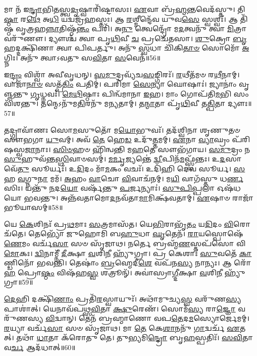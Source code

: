 𑌮𑌾 𑌨᳴ 𑌇\-\ul{𑌨𑍍𑌦𑍍𑌰𑌾}\-𑌭𑌿\-\ul{𑌤}\-𑌸𑍍𑌤𑍍𑌵\-\ul{𑌦𑍃}\-𑌷𑍍𑌵𑌾𑌰𑌿᳴𑌷𑍍𑌟𑌾𑌸𑌃।
\-\ul{𑌏}\-𑌵𑌾 𑌬𑍍𑌰᳴\-\ul{𑌹𑍍𑌮}\-𑌨𑍍𑌤𑌵𑍇𑌦᳴𑌸𑍍𑌤𑍁।
𑌤𑌿\-\ul{𑌷𑍍𑌠𑌾} 𑌰\-\ul{𑌥𑍇} 𑌅\-\ul{𑌧𑌿} 𑌯𑌦𑍍𑌵𑌜𑍍𑌰᳴𑌹𑌸𑍍𑌤𑌃।
𑌆 \ul{𑌰}\-𑌶𑍍𑌮𑍀𑌨𑍍𑌦𑍇᳴𑌵 𑌯𑍁𑌵\-\ul{𑌸𑍇} 𑌸𑍍𑌵𑌶𑍍𑌵𑌃᳴।
𑌆 𑌤𑌿᳴𑌷𑍍𑌠 𑌵𑍃𑌤𑍍𑌰𑌹\-\ul{𑌨𑍍𑌨𑌾}\-𑌤𑌿𑌷𑍍𑌠᳴\-\ul{𑌨𑍍𑌤𑌂} 𑌪𑌰𑌿᳴।
𑌅\-\ul{𑌨𑍁} 𑌤𑍍𑌵𑍇𑌨𑍍𑌦𑍍𑌰𑍋᳴ 𑌮\-\ul{𑌦}\-𑌤𑍍𑌵𑌨𑍁᳴ 𑌤𑍍𑌵𑌾 \ul{𑌮𑌿}\-𑌤𑍍𑌰𑌾𑌵𑌰𑍁᳴𑌣𑍗।
𑌦𑍍𑌯𑍗𑌶𑍍𑌚᳴ 𑌤𑍍𑌵𑌾 𑌪𑍃\-\ul{𑌥𑌿}\-𑌵𑍀 \ul{𑌚} 𑌪𑍍𑌰𑌚𑍇᳴𑌤𑌸𑌾।
\-\ul{𑌶𑍁}\-𑌕𑍍𑌰𑍋 \ul{𑌬𑍃}\-𑌹𑌦𑍍𑌦𑌕𑍍𑌷𑌿᳴𑌣𑌾 𑌤𑍍𑌵𑌾 𑌪𑌿𑌪𑌰𑍍𑌤𑍁।
𑌅𑌨𑍁᳴ \ul{𑌸𑍍𑌵}\-𑌧𑌾 𑌚𑌿᳴𑌕𑌿\-\ul{𑌤𑌾}\-\-\ul{𑍞} 𑌸𑍋𑌮𑍋᳴ \ul{𑌅}\-𑌗𑍍𑌨𑌿𑌃।
𑌅𑌨𑍁᳴ 𑌤𑍍𑌵𑌾𑌽𑌵𑌤𑍁 𑌸\-\ul{𑌵𑌿}\-𑌤𑌾 \ul{𑌸}\-𑌵𑍇𑌨᳴॥56॥

𑌇\-\ul{𑌨𑍍𑌦𑍍𑌰𑌂} 𑌵𑌿𑌶𑍍𑌵𑌾᳴ 𑌅𑌵𑍀𑌵𑍃𑌧𑌨𑍍।
\-\ul{𑌸}\-\-\ul{𑌮𑍁}\-𑌦𑍍𑌰𑌵𑍍𑌯᳴𑌚\-\ul{𑌸}\-𑌙𑍍𑌗𑌿𑌰𑌃᳴।
\-\ul{𑌰}\-𑌥𑍀𑌤᳴𑌮𑍞 𑌰\-\ul{𑌥𑍀}\-𑌨𑌾𑌮𑍍।
𑌵𑌾𑌜𑌾᳴\-\ul{𑌨𑌾}\-\-\ul{𑍞} 𑌸𑌤𑍍𑌪᳴\-\ul{𑌤𑌿𑌂} 𑌪𑌤𑌿𑌮𑍍॑।
𑌪𑌰𑌿᳴𑌮𑌾 \ul{𑌸𑍇}\-𑌨𑍍𑌯𑌾 𑌘𑍋𑌷𑌾𑌃॑।
𑌜𑍍𑌯𑌾𑌨𑌾𑌂॑ 𑌵𑍃𑌞𑍍𑌜𑌨𑍍𑌤𑍁 \ul{𑌗𑍃}\-𑌧𑍍𑌨𑌵𑌃᳴।
\-\ul{𑌮𑍇}\-\-\ul{𑌥𑌿}\-𑌷𑍍𑌠𑌾𑌃 𑌪𑌿𑌨𑍍𑌵᳴𑌮𑌾𑌨𑌾 \ul{𑌇}\-𑌹।
𑌮𑌾𑌂 𑌗𑍋𑌪᳴𑌤𑌿\-\ul{𑌮}\-𑌭𑌿 𑌸𑌂𑌵𑌿᳴𑌶𑌨𑍍𑌤𑍁।
𑌤𑌨𑍍𑌮𑍇\-𑌽𑌨𑍁᳴𑌮\-\ul{𑌤𑌿}\-𑌰𑌨𑍁᳴ 𑌮𑌨𑍍𑌯𑌤𑌾𑌮𑍍।
𑌤\-\ul{𑌨𑍍𑌮𑌾}\-𑌤𑌾 𑌪𑍃᳴\-\ul{𑌥𑌿}\-𑌵𑍀 𑌤\-\ul{𑌤𑍍𑌪𑌿}\-𑌤𑌾 𑌦𑍍𑌯𑍗𑌃॥57॥

𑌤𑌦𑍍𑌗𑍍𑌰𑌾𑌵𑌾᳴𑌣𑌃 𑌸𑍋\-\ul{𑌮}\-𑌸𑍁𑌤𑍋᳴ 𑌮\-\ul{𑌯𑍋}\-𑌭𑍁𑌵𑌃᳴।
𑌤𑌦᳴𑌶𑍍𑌵𑌿𑌨𑌾 𑌶𑍃𑌣𑍁𑌤𑍞 𑌸𑍗𑌭𑌗𑌾 \ul{𑌯𑍁}\-𑌵𑌮𑍍।
𑌅𑌵᳴ \ul{𑌤𑍇} 𑌹𑍇\-\ul{𑌡} 𑌉𑌦𑍁᳴\-\ul{𑌤𑍍𑌤}\-𑌮𑌮𑍍।
\-\ul{𑌏}\-𑌨𑌾 \ul{𑌵𑍍𑌯𑌾}\-𑌘𑍍𑌰𑌂 𑌪᳴𑌰𑌿𑌷𑌸𑍍𑌵\-\ul{𑌜𑌾}\-𑌨𑌾𑌃।
\-\ul{𑌸𑌿}\-\-\ul{𑍞}\-𑌹𑍞 𑌹𑌿᳴𑌨𑍍𑌵𑌨𑍍𑌤𑌿 𑌮\-\ul{𑌹}\-𑌤𑍇 𑌸𑍗𑌭᳴𑌗𑌾𑌯।
\-\ul{𑌸}\-\-\ul{𑌮𑍁}\-𑌦𑍍𑌰𑌂 𑌨 \ul{𑌸𑍁}\-𑌹𑍁𑌵᳴𑌨𑍍𑌤\-\ul{𑌸𑍍𑌥𑌿}\-𑌵𑌾𑍞𑌸𑌮𑍍॑।
\-\ul{𑌮}\-\-\ul{𑌰𑍍𑌮𑍃}\-𑌜𑍍𑌯𑌨𑍍𑌤𑍇॑ \ul{𑌦𑍍𑌵𑍀}\-𑌪𑌿𑌨᳴\-\ul{𑌮}\-𑌫𑍍𑌸𑍍𑌵᳴𑌨𑍍𑌤𑌃।
𑌉\-\ul{𑌦}\-𑌸𑌾𑌵𑍇᳴\-\ul{𑌤𑍁} 𑌸𑍂𑌰𑍍𑌯𑌃᳴।
𑌉\-\ul{𑌦𑌿}\-𑌦𑌂 𑌮𑌾᳴\-\ul{𑌮}\-𑌕𑌂 𑌵𑌚𑌃᳴।
𑌉𑌦𑌿᳴𑌹𑌿 𑌦𑍇𑌵 𑌸𑍂𑌰𑍍𑌯।
\-\ul{𑌸}\-𑌹 \ul{𑌵}\-𑌗𑍍𑌨𑍁\-\ul{𑌨𑌾} 𑌮𑌮᳴।
\-\ul{𑌅}\-𑌹𑌂 \ul{𑌵𑌾}\-𑌚𑍋 \ul{𑌵𑌿}\-𑌵𑌾𑌚᳴𑌨𑌮𑍍।
𑌮\-\ul{𑌯𑌿} 𑌵𑌾𑌗᳴𑌸𑍍𑌤𑍁 𑌧\-\ul{𑌰𑍍𑌣}\-𑌸𑌿𑌃।
𑌯𑌨𑍍𑌤𑍁᳴ \ul{𑌨}\-𑌦\-\ul{𑌯𑍋} 𑌵𑌰𑍍\mbox{}𑌷᳴𑌨𑍍𑌤𑍁 \ul{𑌪}\-𑌰𑍍𑌜𑌨𑍍𑌯𑌾𑌃॑।
\-\ul{𑌸𑍁}\-\-\ul{𑌪𑌿}\-\-\ul{𑌪𑍍𑌪}\-𑌲𑌾 𑌓𑌷᳴𑌧𑌯𑍋 𑌭𑌵𑌨𑍍𑌤𑍁।
𑌅𑌨𑍍𑌨᳴𑌵𑌤𑌾𑌮𑍋\-\ul{𑌦}\-𑌨𑌵᳴𑌤𑌾\-\ul{𑌮𑌾}\-𑌮𑌿𑌕𑍍𑌷᳴𑌵𑌤𑌾𑌮𑍍।
\-\ul{𑌏}\-𑌷𑌾𑍞 𑌰𑌾𑌜𑌾᳴ 𑌭𑍂𑌯𑌾𑌸𑌮𑍍॥58॥\anuvakamend[\-\ul{𑌸𑍍𑌵}\-𑌧𑌾𑌯𑍈॑ 𑌤𑍍𑌵𑌾 \ul{𑌸}\-𑌵𑍇\-\ul{𑌨} 𑌦𑍍𑌯𑍗𑌃 𑌸𑍂॑𑌰𑍍𑌯 \ul{𑌸}\-𑌪𑍍𑌤 𑌚᳴]

𑌯𑍇 \ul{𑌕𑍇}\-𑌶𑌿𑌨𑌃᳴ 𑌪𑍍𑌰\-\ul{𑌥}\-𑌮𑌾𑌃 \ul{𑌸}\-𑌤𑍍𑌰𑌮𑌾𑌸᳴𑌤।
𑌯𑍇\-\ul{𑌭𑌿}\-𑌰𑌾𑌭𑍃᳴\-\ul{𑌤𑌂} 𑌯\-\ul{𑌦𑌿}\-𑌦𑌂 \ul{𑌵𑌿}\-𑌰𑍋𑌚᳴𑌤𑍇।
𑌤𑍇𑌭𑍍𑌯𑍋᳴ 𑌜𑍁𑌹𑍋𑌮𑌿 𑌬\-\ul{𑌹𑍁}\-𑌧𑌾 \ul{𑌘𑍃}\-𑌤𑍇𑌨᳴।
\-\ul{𑌰𑌾}\-𑌯𑌸𑍍𑌪𑍋𑌷𑍇᳴\-\ul{𑌣𑍇}\-𑌮𑌂 𑌵𑌰𑍍𑌚᳴\-\ul{𑌸𑌾} 𑌸𑍞 𑌸𑍃᳴𑌜𑌾𑌥।
𑌨𑌰𑍍𑌤𑍇 𑌬𑍍𑌰𑌹𑍍𑌮᳴\-\ul{𑌣}\-𑌸𑍍𑌤𑌪᳴𑌸𑍋 𑌵𑌿\-\ul{𑌮𑍋}\-𑌕𑌃।
\-\ul{𑌦𑍍𑌵𑌿}\-𑌨𑌾𑌮𑍍𑌨𑍀᳴ \ul{𑌦𑍀}\-𑌕𑍍𑌷𑌾 \ul{𑌵}\-𑌶𑌿\-\ul{𑌨𑍀} 𑌹𑍍𑌯𑍁᳴𑌗𑍍𑌰𑌾।
𑌪𑍍𑌰 𑌕𑍇𑌶𑌾𑌃॑ \ul{𑌸𑍁}\-𑌵𑌤𑍇᳴ \ul{𑌕𑌾}\-𑌣𑍍𑌡𑌿𑌨𑍋᳴ 𑌭𑌵𑌨𑍍𑌤𑌿।
𑌤𑍇𑌷𑌾𑌂॑ \ul{𑌬𑍍𑌰}\-𑌹𑍍𑌮𑍇𑌦𑍀\-\ul{𑌶𑍇} 𑌵𑌪᳴𑌨\-\ul{𑌸𑍍𑌯} 𑌨𑌾𑌨𑍍𑌯𑌃।
𑌆 𑌰𑍋᳴\-\ul{𑌹} 𑌪𑍍𑌰𑍋\-\ul{𑌷𑍍𑌠𑌂} 𑌵𑌿𑌷᳴𑌹\-\ul{𑌸𑍍𑌵} 𑌶𑌤𑍍𑌰𑍂𑌨𑍍᳴।
𑌅𑌵𑌾॑𑌸𑍍𑌰𑌾\-\ul{𑌗𑍍𑌦𑍀}\-𑌕𑍍𑌷𑌾 \ul{𑌵}\-𑌶𑌿\-\ul{𑌨𑍀} 𑌹𑍍𑌯𑍁᳴𑌗𑍍𑌰𑌾॥59॥

\-\ul{𑌦𑍇}\-𑌹𑌿 𑌦𑌕𑍍𑌷𑌿᳴\-\ul{𑌣𑌾𑌂} 𑌪𑍍𑌰𑌤𑌿᳴\-\-\ul{𑌰}\-𑌸𑍍𑌵𑌾𑌯𑍁𑌃᳴।
𑌅𑌥𑌾᳴𑌮𑍁𑌚𑍍𑌯\-\ul{𑌸𑍍𑌵} 𑌵𑌰𑍁᳴𑌣\-\ul{𑌸𑍍𑌯} 𑌪𑌾𑌶𑌾॑𑌤𑍍।
𑌯𑍇𑌨𑌾𑌵᳴𑌪𑌥𑍍𑌸\-\ul{𑌵𑌿}\-𑌤𑌾 \ul{𑌕𑍍𑌷𑍁}\-𑌰𑍇𑌣᳴।
𑌸𑍋𑌮᳴\-\ul{𑌸𑍍𑌯} 𑌰𑌾\-\ul{𑌜𑍍𑌞𑍋} 𑌵𑌰𑍁᳴𑌣𑌸𑍍𑌯 \ul{𑌵𑌿}\-𑌦𑍍𑌵𑌾𑌨𑍍।
𑌤𑍇𑌨᳴ 𑌬𑍍𑌰𑌹𑍍𑌮𑌾𑌣𑍋 𑌵𑌪\-\ul{𑌤𑍇}\-𑌦\-\ul{𑌮}\-𑌸𑍍𑌯𑍋𑌰𑍍𑌜𑍇𑌮𑌮𑍍।
\-\ul{𑌰}\-𑌯𑍍𑌯𑌾 𑌵𑌰𑍍𑌚᳴\-\ul{𑌸𑌾} 𑌸𑍞 𑌸𑍃᳴𑌜𑌾𑌥।
𑌮𑌾 \ul{𑌤𑍇} 𑌕𑍇\-\ul{𑌶𑌾}\-𑌨𑌨𑍁᳴ \ul{𑌗𑌾}\-𑌦𑍍𑌵𑌰𑍍𑌚᳴ \ul{𑌏}\-𑌤𑌤𑍍।
𑌤𑌥𑌾᳴ \ul{𑌧𑌾}\-𑌤𑌾 𑌕᳴𑌰𑍋𑌤𑍁 𑌤𑍇।
𑌤𑍁\-\ul{𑌭𑍍𑌯}\-𑌮𑌿\-\ul{𑌨𑍍𑌦𑍍𑌰𑍋} 𑌬𑍃\-\ul{𑌹}\-𑌸𑍍𑌪𑌤𑌿𑌃᳴।
\-\ul{𑌸}\-\-\ul{𑌵𑌿}\-𑌤𑌾 𑌵\-\ul{𑌰𑍍𑌚} 𑌆𑌦᳴𑌧𑌾𑌤𑍍॥60॥


